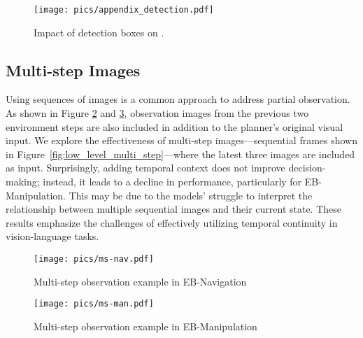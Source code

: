 \begin{figure}[h!]
\begin{center}
\texttt{[image: pics/appendix\_detection.pdf]}
\end{center}
\vspace{-1em}
\caption{Impact of detection boxes on \name.}
\label{fig:low_level_detection}
\end{figure}

\subsection{Multi-step Images}


Using sequences of images is a common approach to address partial observation. As shown in Figure \ref{fig:ms_nav} and \ref{fig:ms_man}, observation images from the previous two environment steps are also included in addition to the planner’s original visual input. We explore the effectiveness of multi-step images—sequential frames shown in Figure~\ref{fig:low_level_multi_step}—where the latest three images are included as input. Surprisingly, adding temporal context does not improve decision-making; instead, it leads to a decline in performance, particularly for EB-Manipulation. This may be due to the models' struggle to interpret the relationship between multiple sequential images and their current state. These results emphasize the challenges of effectively utilizing temporal continuity in vision-language tasks.

\begin{figure}[h!]
\begin{center}
\texttt{[image: pics/ms-nav.pdf]}
\end{center}
\vspace{-1em}
\caption{Multi-step observation example in EB-Navigation}
\label{fig:ms_nav}
\end{figure}

\begin{figure}[h!]
\begin{center}
\texttt{[image: pics/ms-man.pdf]}
\end{center}
\vspace{-1em}
\caption{Multi-step observation example in EB-Manipulation}
\label{fig:ms_man}
\end{figure}


